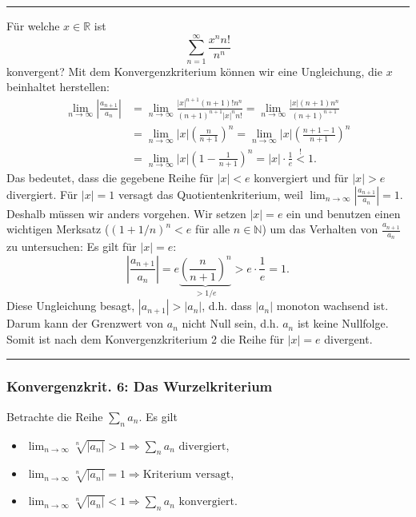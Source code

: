 \documentclass[a4paper,landscape,8pt]{extarticle}
\newcommand{\N}{\mathbb{N}}
\newcommand{\R}{\mathbb{R}}
\newcommand{\abs}[1]{\left\lvert #1 \right\rvert}
\newcommand{\sep}{\vspace{5pt}\noindent\hrule\vspace{5pt}}
\begin{document}
\begin{multicols*}{4}
\begin{warmup}
\sep

\Bsp Für welche $x\in \R$ ist
\[
\sum_{n=1}^{\infty}\frac{x^nn!}{n^n}
\]
konvergent?
Mit dem Konvergenzkriterium können wir eine Ungleichung, die $x$ beinhaltet
herstellen:
\begin{align*}
\lim_{n\to\infty} \abs{\frac{a_{n+1}}{a_n}}
&= \lim_{n\to\infty} \frac{\abs{x}^{n+1}(n+1)!n^n}{(n+1)^{n+1}\abs{x}^nn!}
= \lim_{n\to\infty} \frac{\abs{x}(n+1)n^n}{(n+1)^{n+1}}\\
&= \lim_{n\to\infty} \abs{x} \left(\frac{n}{n+1}\right)^n
= \lim_{n\to\infty} \abs{x} \left(\frac{n+1-1}{n+1}\right)^n\\
&= \lim_{n\to\infty} \abs{x} \left(1-\frac{1}{n+1}\right)^n
=\abs{x}\cdot\frac{1}{e} \stackrel{!}{<} 1.
\end{align*}
Das bedeutet, dass die gegebene Reihe für $\abs{x}<e$ konvergiert und für
$\abs{x}>e$ divergiert. Für $\abs{x}=1$ versagt das Quotientenkriterium, weil
$\lim_{n\to\infty}\abs{\frac{a_{n+1}}{a_n}}=1$. Deshalb müssen wir anders
vorgehen. Wir setzen $\abs{x}=e$ ein und benutzen einen wichtigen Merksatz
($(1+1/n)^n<e$ für alle $n\in \N$) um das Verhalten von $\frac{a_{n+1}}{a_n}$ zu
untersuchen: Es gilt für $\abs{x}=e$:
\[
\abs{\frac{a_{n+1}}{a_n}}=e\underbrace{\left(\frac{n}{n+1}\right)^{n}}_{>1/e}
> e\cdot \frac{1}{e} = 1.
\]
Diese Ungleichung besagt, $\abs{a_{n+1}}>\abs{a_n}$, d.h. dass $\abs{a_n}$
monoton wachsend ist. Darum kann der Grenzwert von $a_n$ nicht Null sein, d.h.
$a_n$ ist keine Nullfolge. Somit ist nach dem Konvergenzkriterium 2 die Reihe
für $\abs{x}=e$ divergent.
\end{warmup}

\sep

\subsubsection{Konvergenzkrit. 6: Das Wurzelkriterium}

\Satz[Wurzelkriterium] Betrachte die Reihe $\sum_n a_n$. Es gilt
\begin{itemize}
  \item $\lim_{n\to\infty} \sqrt[n]{\abs{a_n}}>1 \Longrightarrow \sum_n a_n
  \text { divergiert}$,
  \item $\lim_{n\to\infty} \sqrt[n]{\abs{a_n}}=1 
  \Longrightarrow \text {Kriterium versagt}$,
  \item $\lim_{n\to\infty} \sqrt[n]{\abs{a_n}}<1 \Longrightarrow \sum_n a_n
  \text { konvergiert}$.
\end{itemize}


\end{multicols*}
\end{document}

